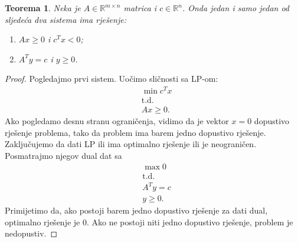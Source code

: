 \documentclass[b5paper, utf8, 11pt, colorlinks]{book}
\newtheorem{thm}{Teorema}[chapter]
\theoremstyle{definition}
\begin{document}
\begin{thm}
	Neka je $A\in \mathbb{R}^{m \times n}$ matrica i $c\in \mathbb{R}^n$. Onda jedan i samo jedan od  sljedeća dva sistema ima rješenje:
	\begin{enumerate}
		\item  $Ax \geq 0$  i $c^T x < 0$; \label{case:1}
		\item $A^T y = c$ i $y \geq 0$. \label{case:2}
	\end{enumerate}
\end{thm}

\begin{proof}
	Pogledajmo prvi sistem. Uočimo sličnosti sa   LP-om:
	\begin{align*}
		&\min c^T x \\
		&\mbox{t.d.} \\
		& A x \geq 0.
	\end{align*}
	Ako pogledamo desnu stranu ograničenja, vidimo da je vektor $x = 0$ 
	dopustivo rješenje problema, tako da problem ima barem jedno dopustivo rješenje. Zaključujemo da dati LP  ili ima optimalno rješenje ili je neograničen. Posmatrajmo njegov dual   dat sa 
	\begin{align*}
		&\max 0 \\
		&\mbox{t.d.} \\
		& A^T y  = c \\
		& y \geq 0.
	\end{align*}
	Primijetimo da, ako postoji barem jedno dopustivo rješenje za dati dual, optimalno rješenje je 0. Ako ne postoji niti jedno dopustivo rješenje, problem je nedopustiv. 
	

\end{proof}
\end{document}
